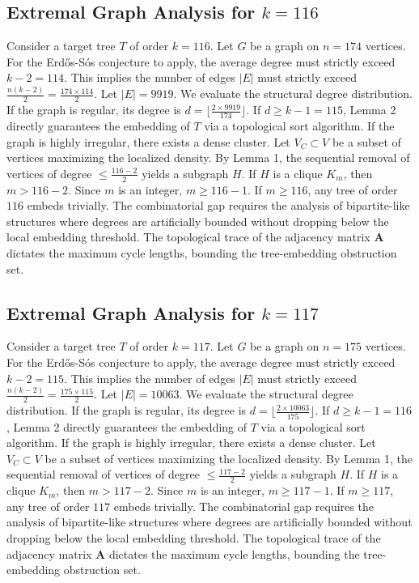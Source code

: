 \documentclass[11pt,a4paper]{article}
\begin{document}
\subsection{Extremal Graph Analysis for $k=116$}
Consider a target tree $T$ of order $k=116$.
Let $G$ be a graph on $n=174$ vertices.
For the Erd\H{o}s-S\'os conjecture to apply, the average degree must strictly exceed $k-2 = 114$.
This implies the number of edges $|E|$ must strictly exceed $\frac{n(k-2)}{2} = \frac{174 \times 114}{2}$.
Let $|E| = 9919$.
We evaluate the structural degree distribution. If the graph is regular, its degree is $d = \lfloor \frac{2 \times 9919}{174} \rfloor$.
If $d \geq k-1 = 115$, Lemma 2 directly guarantees the embedding of $T$ via a topological sort algorithm.
If the graph is highly irregular, there exists a dense cluster. Let $V_C \subset V$ be a subset of vertices maximizing the localized density.
By Lemma 1, the sequential removal of vertices of degree $\leq \frac{116-2}{2}$ yields a subgraph $H$.
If $H$ is a clique $K_{m}$, then $m > 116-2$. Since $m$ is an integer, $m \geq 116-1$. If $m \geq 116$, any tree of order $116$ embeds trivially.
The combinatorial gap requires the analysis of bipartite-like structures where degrees are artificially bounded without dropping below the local embedding threshold. The topological trace of the adjacency matrix $\mathbf{A}$ dictates the maximum cycle lengths, bounding the tree-embedding obstruction set.


\subsection{Extremal Graph Analysis for $k=117$}
Consider a target tree $T$ of order $k=117$.
Let $G$ be a graph on $n=175$ vertices.
For the Erd\H{o}s-S\'os conjecture to apply, the average degree must strictly exceed $k-2 = 115$.
This implies the number of edges $|E|$ must strictly exceed $\frac{n(k-2)}{2} = \frac{175 \times 115}{2}$.
Let $|E| = 10063$.
We evaluate the structural degree distribution. If the graph is regular, its degree is $d = \lfloor \frac{2 \times 10063}{175} \rfloor$.
If $d \geq k-1 = 116$, Lemma 2 directly guarantees the embedding of $T$ via a topological sort algorithm.
If the graph is highly irregular, there exists a dense cluster. Let $V_C \subset V$ be a subset of vertices maximizing the localized density.
By Lemma 1, the sequential removal of vertices of degree $\leq \frac{117-2}{2}$ yields a subgraph $H$.
If $H$ is a clique $K_{m}$, then $m > 117-2$. Since $m$ is an integer, $m \geq 117-1$. If $m \geq 117$, any tree of order $117$ embeds trivially.
The combinatorial gap requires the analysis of bipartite-like structures where degrees are artificially bounded without dropping below the local embedding threshold. The topological trace of the adjacency matrix $\mathbf{A}$ dictates the maximum cycle lengths, bounding the tree-embedding obstruction set.
\end{document}
